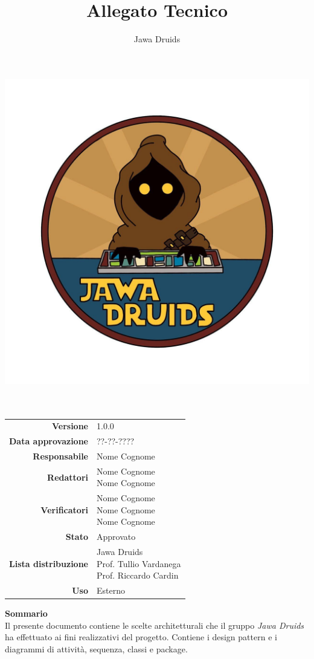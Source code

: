


	\makeatletter
	\begin{titlepage}
		\begin{center}
			\vspace*{-4,0cm}
			\author{Jawa Druids}
			\title{Allegato Tecnico}
			\date{}
			\includegraphics[width=0.5\linewidth]{../immagini/DRUIDSLOGO.jpg}\\[4ex]

			
			{\huge \bfseries  \@title }\\[2ex] 
			{\LARGE  \@author}\\[50ex]
			\vspace*{-9,0cm}
			\begin{table}[H]
			\renewcommand{\arraystretch}{1.4}
			\centering
			\begin{tabular}{r | l}
				\textbf{Versione} & 1.0.0 \\%
				\textbf{Data approvazione} & ??-??-????\\
				\textbf{Responsabile} & Nome Cognome \\
				\textbf{Redattori} & \makecell[tl]{Nome Cognome \\ Nome Cognome} \\		
				\textbf{Verificatori} & \makecell[tl]{Nome Cognome \\ Nome Cognome \\Nome Cognome} \\
				\textbf{Stato} & Approvato\\
				\textbf{Lista distribuzione} & \makecell[tl]{Jawa Druids \\ Prof. Tullio Vardanega \\ Prof. Riccardo Cardin}\\
				\textbf{Uso} & Esterno     
			\end{tabular}
		\end{table}
		\vspace{0.1cm}
		\hfill \break
		\fontsize{17}{10}\textbf{Sommario} \\
		\vspace{0.1cm}
		Il presente documento contiene le scelte architetturali che il gruppo \emph{\normalsize{\textit{Jawa Druids}}} ha effettuato ai fini realizzativi del progetto. Contiene i design pattern e i diagrammi di attività, sequenza, classi e package.
		\end{center}
	\end{titlepage}
	\makeatother
	
	
	\tableofcontents{}
	\listoftables{}
	\listoffigures{}
	
	
	
	
